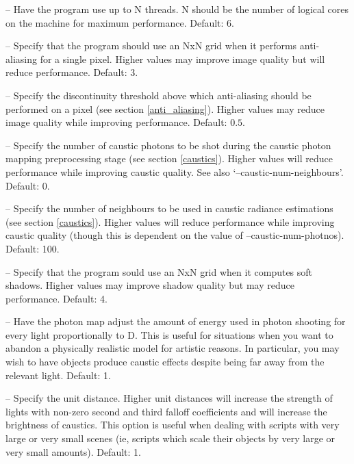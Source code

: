 \documentclass{article}
\begin{document}
\begin{itemize}

   -- Have the program use up to N threads. N should be
  the number of logical cores on the machine for maximum performance. Default:
  6.

   -- Specify that the program should use an NxN grid when
  it performs anti-aliasing for a single pixel. Higher values may improve image
  quality but will reduce performance. Default: 3.

   -- Specify the discontinuity threshold above which
  anti-aliasing should be performed on a pixel (see section
  \ref{anti_aliasing}). Higher values may reduce image quality while improving
  performance. Default: $0.5$.

   -- Specify the number of caustic photons to be
  shot during the caustic photon mapping preprocessing stage (see section
  \ref{caustics}). Higher values will reduce performance while improving caustic
  quality. See also `--caustic-num-neighbours'. Default: 0.

   -- Specify the number of neighbours to be
  used in caustic radiance estimations (see section \ref{caustics}). Higher
  values will reduce performance while improving caustic quality (though this is
  dependent on the value of --caustic-num-photnos). Default: 100.

   -- Specify that the program sould use an NxN grid when
  it computes soft shadows. Higher values may improve shadow quality but may
  reduce performance. Default: 4.

   -- Have the photon map adjust the amount of energy
  used in photon shooting for every light proportionally to D. This is useful
  for situations when you want to abandon a physically realistic model for
  artistic reasons. In particular, you may wish to have objects produce caustic
  effects despite being far away from the relevant light. Default: 1.

   -- Specify the unit distance. Higher unit distances
  will increase the strength of lights with non-zero second and third falloff
  coefficients and will increase the brightness of caustics. This option is
  useful when dealing with scripts with very large or very small scenes (ie,
  scripts which scale their objects by very large or very small amounts).
  Default: 1.


\end{itemize}
\end{document}
